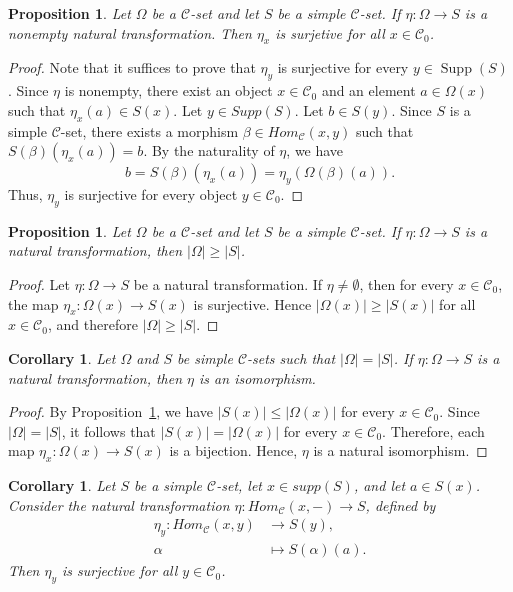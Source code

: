 \documentclass[a4paper]{article}
\newtheorem{cor}[thm]{Corollary}
\newtheorem{prop}[thm]{Proposition}
\theoremstyle{definition}
\theoremstyle{remark}
\newcommand*{\cat}[1]{\mathcal{#1}}
\begin{document}
\begin{prop}
    Let $\Omega$ be a $\cat{C}$-set and let $S$ be a simple $\cat{C}$-set. If $\eta \colon \Omega \to S$ is a nonempty natural transformation. Then $\eta_x$ is surjetive for all $x\in \cat{C}_0$. 
\end{prop}
\begin{proof}
Note that it suffices to prove that $\eta_y$ is surjective for every $y\in \operatorname{Supp}(S)$. Since $\eta$ is nonempty, there exist an object $x\in\cat{C}_0$ and an element $a\in\Omega(x)$ such that $\eta_x(a)\in S(x)$. Let $y\in Supp(S)$. 
 Let $b\in S(y)$. Since $S$ is a simple $\cat{C}$-set, there exists a morphism $\beta\in Hom_{\cat{C}}(x,y)$ such that $ 
S(\beta)(\eta_x(a)) = b.
$
By the naturality of $\eta$, we have
\[
b = S(\beta)(\eta_x(a)) = \eta_y(\Omega(\beta)(a)).
\]
Thus, $\eta_y$ is surjective for every object $y\in\cat{C}_0$. 
\end{proof}





\begin{prop}\label{| | <| |}
Let $\Omega$ be a $\cat{C}$-set and let $S$ be a simple $\cat{C}$-set. If $\eta \colon \Omega \to S$ is a natural transformation, then $|\Omega| \geq |S|$.
\end{prop}

\begin{proof}
Let $\eta \colon \Omega \to S$ be a natural transformation. If $\eta \neq \emptyset$, then for every $x \in \cat{C}_0$, the map $\eta_x \colon \Omega(x) \to S(x)$ is surjective. Hence $|\Omega(x)| \geq |S(x)|$ for all $x \in \cat{C}_0$, and therefore $|\Omega| \geq |S|$.
\end{proof}

\begin{cor}\label{| | =| |}
  Let $\Omega$ and $S$ be simple $\mathcal{C}$-sets such that $ |\Omega |=|S|$. If $\eta \colon \Omega \to S$ is a natural transformation, then $\eta$ is an isomorphism.
\end{cor}
\begin{proof}
By Proposition~\ref{| | <| |}, we have $|S(x)| \leq |\Omega(x)| $
for every $x \in \mathcal{C}_0$. Since $|\Omega| = |S|$, it follows that $|S(x)| = |\Omega(x)| $
for every $x \in \mathcal{C}_0$. Therefore, each map $\eta_x \colon \Omega(x) \to S(x)$
is a bijection. Hence, $\eta$ is a natural isomorphism.
\end{proof}


\begin{cor}
Let $S$ be a simple $\cat{C}$-set, let $x \in supp(S)$, and let $a \in S(x)$. Consider the natural transformation $  \eta \colon Hom_{\cat{C}}(x, -) \longrightarrow S$, defined by
\begin{align*}
    \eta_y \colon Hom_{\cat{C}}(x, y) &\longrightarrow S(y), \\
    \alpha &\longmapsto S(\alpha)(a).
\end{align*}
Then $\eta_y$ is surjective for all $y \in \cat{C}_0$.
\end{cor}
\end{document}
